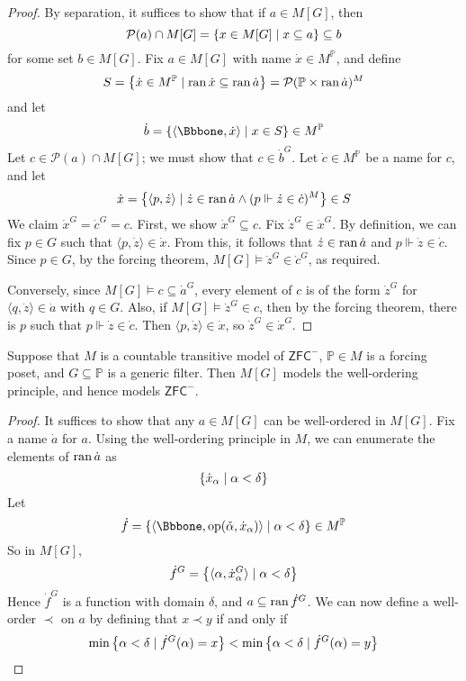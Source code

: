 \begin{proof}
    By separation, it suffices to show that if \( a \in M[G] \), then
    \[ \mathcal P(a) \cap M[G] = \qty{x \in M[G] \mid x \subseteq a} \subseteq b \]
    for some set \( b \in M[G] \).
    Fix \( a \in M[G] \) with name \( \dot x \in M^{\mathbb P} \), and define
    \[ S = \qty{\dot x \in M^{\mathbb P} \mid \operatorname{ran}\dot x \subseteq \operatorname{ran}\dot a} = \mathcal P(\mathbb P \times \operatorname{ran} \dot a)^M \]
    and let
    \[ \dot b = \qty{\langle \Bbbone, \dot x \rangle \mid x \in S} \in M^{\mathbb P} \]
    Let \( c \in \mathcal P(a) \cap M[G] \); we must show that \( c \in \dot b^G \).
    Let \( \dot c \in M^{\mathbb P} \) be a name for \( c \), and let
    \[ \dot x = \qty{\langle p, \dot z \rangle \mid \dot z \in \operatorname{ran}\dot a \wedge (p \Vdash \dot z \in \dot c)^M} \in S \]
    We claim \( \dot x^G = \dot c^G = c \).
    First, we show \( \dot x^G \subseteq c \).
    Fix \( \dot z^G \in \dot x^G \).
    By definition, we can fix \( p \in G \) such that \( \langle p, \dot z \rangle \in \dot x \).
    From this, it follows that \( \dot z \in \operatorname{ran} \dot a \) and \( p \Vdash \dot z \in \dot c \).
    Since \( p \in G \), by the forcing theorem, \( M[G] \vDash \dot z^G \in \dot c^G \), as required.

    Conversely, since \( M[G] \vDash c \subseteq \dot a^G \), every element of \( c \) is of the form \( \dot z^G \) for \( \langle q, \dot z \rangle \in \dot a \) with \( q \in G \).
    Also, if \( M[G] \vDash \dot z^G \in c \), then by the forcing theorem, there is \( p \) such that \( p \Vdash \dot z \in \dot c \).
    Then \( \langle p, \dot z \rangle \in \dot x \), so \( \dot z^G \in \dot x^G \).
\end{proof}
\begin{lemma}
    Suppose that \( M \) is a countable transitive model of \( \mathsf{ZFC}^- \), \( \mathbb P \in M \) is a forcing poset, and \( G \subseteq \mathbb P \) is a generic filter.
    Then \( M[G] \) models the well-ordering principle, and hence models \( \mathsf{ZFC}^- \).
\end{lemma}
\begin{proof}
    It suffices to show that any \( a \in M[G] \) can be well-ordered in \( M[G] \).
    Fix a name \( \dot a \) for \( a \).
    Using the well-ordering principle in \( M \), we can enumerate the elements of \( \operatorname{ran} \dot a \) as
    \[ \qty{\dot x_\alpha \mid \alpha < \delta} \]
    Let
    \[ \dot f = \qty{\langle \Bbbone, \operatorname{op}(\check \alpha, \dot x_\alpha) \rangle \mid \alpha < \delta} \in M^{\mathbb P} \]
    So in \( M[G] \),
    \[ \dot f^G = \qty{\langle \alpha, \dot x_\alpha^G \rangle \mid \alpha < \delta} \]
    Hence \( \dot f^G \) is a function with domain \( \delta \), and \( a \subseteq \operatorname{ran} \dot f^G \).
    We can now define a well-order \( \prec \) on \( a \) by defining that \( x \prec y \) if and only if
    \[ \min\qty{\alpha < \delta \mid \dot f^G(\alpha) = x} < \min\qty{\alpha < \delta \mid \dot f^G(\alpha) = y} \]
\end{proof}
